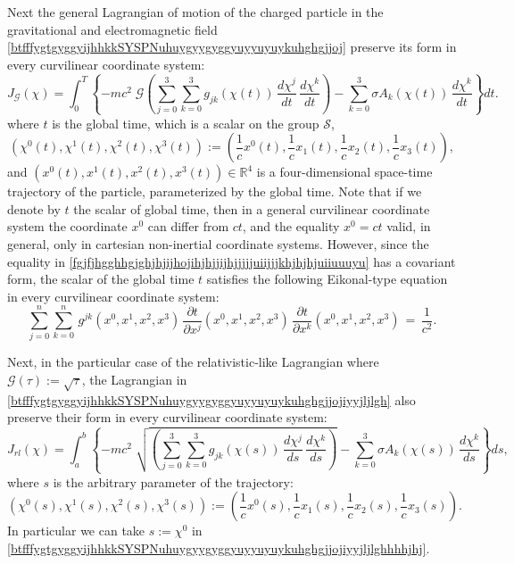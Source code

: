\documentclass{article}
\theoremstyle{definition}
\theoremstyle{remark}
\newcommand{\er}{\eqref}
\newcommand{\er}{\eqref}
\begin{document}
Next the general Lagrangian of motion of the charged particle in the
gravitational and electromagnetic field
\er{btfffygtgyggyijhhkkSYSPNuhuygyygyggyuyyuyuykuhghgjjoj} preserve
its form in every curvilinear coordinate system:
\begin{equation}\label{btfffygtgyggyijhhkkSYSPNuhuygyygyggyuyyuyuykuhghgjjojhjfg}
J_{\mathcal{G}}(\chi)=
\int_0^T\left\{-mc^2\;\mathcal{G}\left(\sum_{j=0}^{3}\sum_{k=0}^{3}g_{jk}\left(\chi(t)\right)\,\frac{d\chi^j}{dt}\,\frac{d\chi^k}{dt}\right)-\sum_{k=0}^{3}\sigma
A_k\left(\chi(t)\right)\,\frac{d\chi^k}{dt}\right\}dt.
\end{equation}
where $t$ is the global time, which is a scalar on the group
$\mathcal{S}$,
\begin{equation}\label{btfffjhgjghghijhh}
\left(\chi^0(t),\chi^1(t),\chi^2(t),\chi^3(t)\right):=\left(\frac{1}{c}x^0(t),\frac{1}{c}x_1(t),\frac{1}{c}x_2(t),\frac{1}{c}x_3(t)\right),
\end{equation}
and $\left(x^0(t),x^1(t),x^2(t),x^3(t)\right)\in\mathbb{R}^4$ is a
four-dimensional space-time trajectory of the particle,
parameterized by the global time. Note that if we denote by $t$ the
scalar of global time, then in a general curvilinear coordinate
system the coordinate $x^0$ can differ from $ct$, and the equality
$x^0=ct$ valid, in general, only in cartesian non-inertial
coordinate systems. However, since the equality in
\er{fgjfjhgghhgjghjhjijhojihjhjjijhjjjjjuiijjjkhjhjhjuiiuuuyu} has a
covariant form, the scalar of the global time $t$ satisfies the
following Eikonal-type equation in every curvilinear coordinate
system:
\begin{equation}\label{fgjfjhgghhgjghjhjijhojihjhjjijhjjjjjuiijjjkhjhjhjuiiuuuyuuoiuuiio}
\sum_{j=0}^{n}\sum_{k=0}^{n}\,g^{jk}(x^0,x^1,x^2,x^3)\,\frac{\partial
t}{\partial x^j}(x^0,x^1,x^2,x^3)\,\frac{\partial t}{\partial
x^k}(x^0,x^1,x^2,x^3)\,=\, \frac{1}{c^2}.
\end{equation}



Next, in the particular case of the relativistic-like Lagrangian
where $\mathcal{G}(\tau):=\sqrt{\tau}$, the Lagrangian in
\er{btfffygtgyggyijhhkkSYSPNuhuygyygyggyuyyuyuykuhghgjjojiyyjljlgh}
also preserve their form in every curvilinear coordinate system:
\begin{equation}\label{btfffygtgyggyijhhkkSYSPNuhuygyygyggyuyyuyuykuhghgjjojiyyjljlghhhhjhj}
J_{rl}(\chi)=
\int_a^b\left\{-mc^2\;\sqrt{\left(\sum_{j=0}^{3}\sum_{k=0}^{3}g_{jk}\left(\chi(s)\right)\,\frac{d\chi^j}{ds}\,\frac{d\chi^k}{ds}\right)}-\sum_{k=0}^{3}\sigma
A_k\left(\chi(s)\right)\,\frac{d\chi^k}{ds}\right\}ds,
\end{equation}
where $s$ is the arbitrary parameter of the trajectory:
\begin{equation}\label{btfffjhgjghghijhhhu}
\left(\chi^0(s),\chi^1(s),\chi^2(s),\chi^3(s)\right):=\left(\frac{1}{c}x^0(s),\frac{1}{c}x_1(s),\frac{1}{c}x_2(s),\frac{1}{c}x_3(s)\right).
\end{equation}
In particular we can take $s:=\chi^0$ in
\er{btfffygtgyggyijhhkkSYSPNuhuygyygyggyuyyuyuykuhghgjjojiyyjljlghhhhjhj}.
\end{document}
